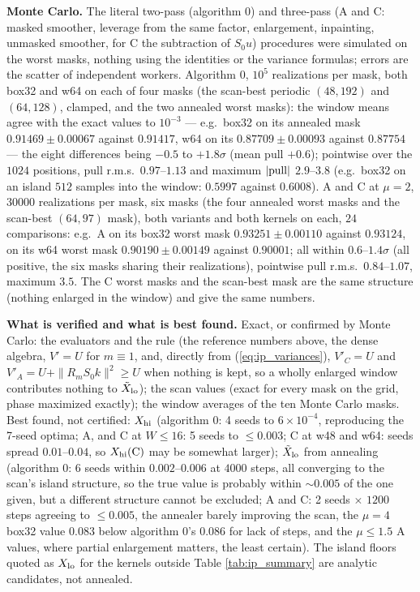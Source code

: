 \documentclass{article}
\numberwithin{equation}{section}   %
\begin{document}
{\bf Monte Carlo.}  The literal two-pass (algorithm 0) and three-pass (A and C: masked smoother,
leverage from the same factor, enlargement, inpainting, unmasked smoother, for C the subtraction of
$S_0u$) procedures were simulated on the worst masks, nothing using the identities or the variance
formulas; errors are the scatter of independent workers.  Algorithm 0, $10^5$ realizations per mask,
both box32 and w64 on each of four masks (the scan-best periodic $(48, 192)$ and $(64, 128)$, clamped, and
the two annealed worst masks): the window means agree with the exact values to $10^{-3}$ --- e.g.\ box32 on
its annealed mask $0.91469 \pm 0.00067$ against $0.91417$, w64 on its $0.87709 \pm 0.00093$ against
$0.87754$ --- the eight differences being $-0.5$ to $+1.8\sigma$ (mean pull $+0.6$); pointwise over the
$1024$ positions, pull r.m.s.\ $0.97$--$1.13$ and maximum $|{\rm pull}|$ $2.9$--$3.8$ (e.g.\ box32 on an island
$512$ samples into the window: $0.5997$ against $0.6008$).  A and C at $\mu = 2$, $30000$ realizations per
mask, six masks (the four annealed worst masks and the scan-best $(64, 97)$ mask), both variants and both
kernels on each, $24$ comparisons: e.g.\ A on its box32 worst mask $0.93251 \pm 0.00110$ against $0.93124$,
on its w64 worst mask $0.90190 \pm 0.00149$ against $0.90001$; all within $0.6$--$1.4\sigma$ (all positive,
the six masks sharing their realizations), pointwise pull r.m.s.\ $0.84$--$1.07$, maximum $3.5$.  The C worst
masks and the scan-best mask are the same structure (nothing enlarged in the window) and give the same
numbers.

{\bf What is verified and what is best found.}  Exact, or confirmed by Monte Carlo: the evaluators and
the rule (the reference numbers above, the dense algebra, $V' = U$ for $m \equiv 1$, and, directly from
(\ref{eq:ip_variances}), $V'_C = U$ and $V'_A = U + \|R_mS_0k\|^2 \ge U$ when nothing is kept, so a wholly
enlarged window contributes nothing to $\tilde X_{\rm lo}$); the scan values (exact for every mask on
the grid, phase maximized exactly); the window averages of the ten Monte Carlo masks.  Best found, not
certified: $X_{\rm hi}$ (algorithm 0: 4 seeds to $6 \times 10^{-4}$, reproducing the 7-seed optima; A, and C
at $W \le 16$: 5 seeds to $\le 0.003$; C at w48 and w64: seeds spread $0.01$--$0.04$, so $X_{\rm hi}({\rm C})$
may be somewhat larger); $\tilde X_{\rm lo}$ from annealing (algorithm 0: 6 seeds within
$0.002$--$0.006$ at $4000$ steps, all converging to the scan's island structure, so the true value is
probably within $\sim 0.005$ of the one given, but a different structure cannot be excluded; A and C:
2 seeds $\times$ $1200$ steps agreeing to $\le 0.005$, the annealer barely improving the scan, the
$\mu = 4$ box32 value $0.083$ below algorithm 0's $0.086$ for lack of steps, and the $\mu \le 1.5$ A
values, where partial enlargement matters, the least certain).  The island floors quoted as $X_{\rm lo}$
for the kernels outside Table \ref{tab:ip_summary} are analytic candidates, not annealed.
\end{document}
